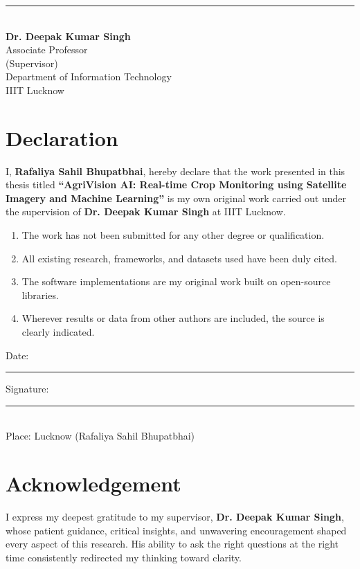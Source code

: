\documentclass[12pt,a4paper,oneside]{report}
\begin{document}
\begin{minipage}{0.45\textwidth}
  \centering
  \rule{5cm}{0.5pt}\\[4pt]
  \textbf{Dr. Deepak Kumar Singh}\\
  Associate Professor\\
  (Supervisor)\\
  Department of Information Technology\\
  IIIT Lucknow
\end{minipage}
\clearpage

\chapter*{Declaration}
I, \textbf{Rafaliya Sahil Bhupatbhai}, hereby declare that the work presented in
this thesis titled \textbf{``AgriVision AI: Real-time Crop Monitoring using
Satellite Imagery and Machine Learning''} is my own original work carried out
under the supervision of \textbf{Dr. Deepak Kumar Singh} at IIIT Lucknow.

\begin{enumerate}
  \item The work has not been submitted for any other degree or qualification.
  \item All existing research, frameworks, and datasets used have been duly cited.
  \item The software implementations are my original work built on open-source
        libraries.
  \item Wherever results or data from other authors are included, the source is
        clearly indicated.
\end{enumerate}

\vspace{2.5cm}
\noindent Date:~\rule{4cm}{0.5pt} \hfill Signature:~\rule{5cm}{0.5pt}\\[6pt]
\noindent Place: Lucknow \hfill (Rafaliya Sahil Bhupatbhai)
\clearpage

\chapter*{Acknowledgement}
I express my deepest gratitude to my supervisor, \textbf{Dr. Deepak Kumar Singh},
whose patient guidance, critical insights, and unwavering encouragement shaped
every aspect of this research. His ability to ask the right questions at the right
time consistently redirected my thinking toward clarity.
\end{document}
